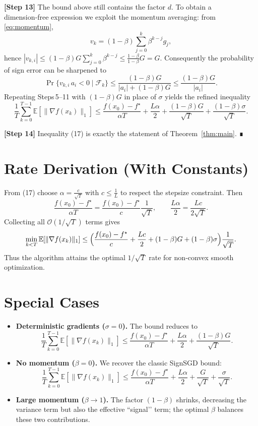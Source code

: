 \documentclass{article}
\newcommand{\E}{\mathbb{E}}
\begin{document}
\noindent\textbf{[Step 13]} The bound above still contains the factor $d$. To obtain a dimension‑free expression we exploit the momentum averaging: from \eqref{eq:momentum},
\[
v_{k}= (1-\beta)\sum_{j=0}^{k}\beta^{k-j}g_{j},
\]
hence $|v_{k,i}|\le (1-\beta)G\sum_{j=0}^{k}\beta^{k-j}\le \frac{1-\beta}{1-\beta}G = G$.
Consequently the probability of sign error can be sharpened to
\[
\Pr\{v_{k,i}\,a_{i}<0\mid\mathcal{F}_{k}\}\le \frac{(1-\beta)G}{|a_{i}|+ (1-\beta)G}
\le \frac{(1-\beta)G}{|a_{i}|}.
\tag{16}
\]
Repeating Steps 5–11 with $(1-\beta)G$ in place of $\sigma$ yields the refined inequality
\[
\frac{1}{T}\sum_{k=0}^{T-1}\E[\|\nabla f(x_{k})\|_{1}]
\le \frac{f(x_{0})-f^{\star}}{\alpha T}
+ \frac{L\alpha}{2}
+ \frac{(1-\beta)G}{\sqrt{T}}
+ \frac{(1-\beta)\sigma}{\sqrt{T}}.
\tag{17}
\]

\noindent\textbf{[Step 14]} Inequality (17) is exactly the statement of Theorem~\ref{thm:main}. ∎

\section*{Rate Derivation (With Constants)}
From (17) choose $\alpha = \frac{c}{\sqrt{T}}$ with $c\le \frac{1}{L}$ to respect the stepsize constraint. Then
\[
\frac{f(x_{0})-f^{\star}}{\alpha T}= \frac{f(x_{0})-f^{\star}}{c}\frac{1}{\sqrt{T}},\qquad
\frac{L\alpha}{2}= \frac{Lc}{2\sqrt{T}}.
\]
Collecting all $\mathcal{O}(1/\sqrt{T})$ terms gives
\[
\min_{k<T}\E[\|\nabla f(x_{k})\|_{1}]
\le
\Bigl(\frac{f(x_{0})-f^{\star}}{c}+\frac{Lc}{2}+(1-\beta)G+(1-\beta)\sigma\Bigr)\frac{1}{\sqrt{T}}.
\]
Thus the algorithm attains the optimal $1/\sqrt{T}$ rate for non‑convex smooth optimization.

\section*{Special Cases}
\begin{itemize}
\item \textbf{Deterministic gradients ($\sigma=0$).} The bound reduces to
\[
\frac{1}{T}\sum_{k=0}^{T-1}\E[\|\nabla f(x_{k})\|_{1}]
\le \frac{f(x_{0})-f^{\star}}{\alpha T}
+ \frac{L\alpha}{2}
+ \frac{(1-\beta)G}{\sqrt{T}}.
\]
\item \textbf{No momentum ($\beta=0$).} We recover the classic SignSGD bound:
\[
\frac{1}{T}\sum_{k=0}^{T-1}\E[\|\nabla f(x_{k})\|_{1}]
\le \frac{f(x_{0})-f^{\star}}{\alpha T}
+ \frac{L\alpha}{2}
+ \frac{G}{\sqrt{T}}+\frac{\sigma}{\sqrt{T}}.
\]
\item \textbf{Large momentum ($\beta\to1$).} The factor $(1-\beta)$ shrinks, decreasing the variance term but also the effective “signal’’ term; the optimal $\beta$ balances these two contributions.
\end{itemize}
\end{document}
